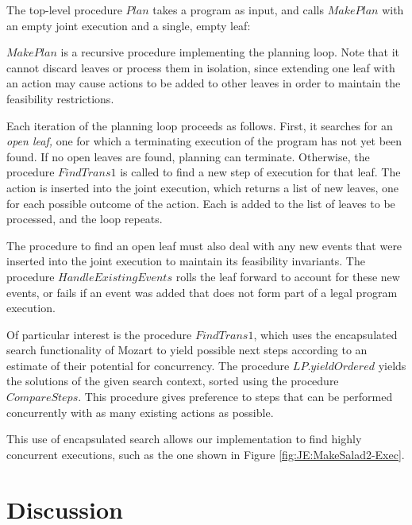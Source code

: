 The top-level procedure $Plan$ takes a program as input, and calls
$MakePlan$ with an empty joint execution and a single, empty leaf:


$MakePlan$ is a recursive procedure implementing the planning loop.
Note that it cannot discard leaves or process them in isolation, since
extending one leaf with an action may cause actions to be added to
other leaves in order to maintain the feasibility restrictions.


Each iteration of the planning loop proceeds as follows. First, it
searches for an \emph{open leaf,} one for which a terminating execution
of the program has not yet been found. If no open leaves are found,
planning can terminate. Otherwise, the procedure $FindTrans1$ is
called to find a new step of execution for that leaf. The action is
inserted into the joint execution, which returns a list of new leaves,
one for each possible outcome of the action. Each is added to the
list of leaves to be processed, and the loop repeats.

The procedure to find an open leaf must also deal with any new events
that were inserted into the joint execution to maintain its feasibility
invariants. The procedure $HandleExistingEvents$ rolls the leaf forward
to account for these new events, or fails if an event was added that
does not form part of a legal program execution.


Of particular interest is the procedure $FindTrans1$, which uses
the encapsulated search functionality of Mozart to yield possible
next steps according to an estimate of their potential for concurrency.
The procedure $LP.yieldOrdered$ yields the solutions of the given
search context, sorted using the procedure $CompareSteps$. This procedure
gives preference to steps that can be performed concurrently with
as many existing actions as possible.


This use of encapsulated search allows our implementation to find
highly concurrent executions, such as the one shown in Figure \ref{fig:JE:MakeSalad2-Exec}.


\section{Discussion\label{sec:JointExec:Discussion}}


